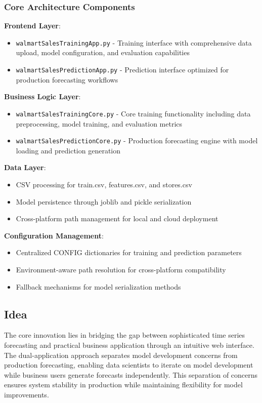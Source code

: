 \subsubsection{Core Architecture Components}

\textbf{Frontend Layer}: 
\begin{itemize}
	\item \texttt{walmartSalesTrainingApp.py} - Training interface with comprehensive data upload, model configuration, and evaluation capabilities
	\item \texttt{walmartSalesPredictionApp.py} - Prediction interface optimized for production forecasting workflows
\end{itemize}

\textbf{Business Logic Layer}:
\begin{itemize}
	\item \texttt{walmartSalesTrainingCore.py} - Core training functionality including data preprocessing, model training, and evaluation metrics
	\item \texttt{walmartSalesPredictionCore.py} - Production forecasting engine with model loading and prediction generation
\end{itemize}

\textbf{Data Layer}:
\begin{itemize}
	\item CSV processing for train.csv, features.csv, and stores.csv
	\item Model persistence through joblib and pickle serialization
	\item Cross-platform path management for local and cloud deployment
\end{itemize}

\textbf{Configuration Management}:
\begin{itemize}
	\item Centralized CONFIG dictionaries for training and prediction parameters
	\item Environment-aware path resolution for cross-platform compatibility
	\item Fallback mechanisms for model serialization methods
\end{itemize}

\subsection{Idea}

The core innovation lies in bridging the gap between sophisticated time series forecasting and practical business application through an intuitive web interface. The dual-application approach separates model development concerns from production forecasting, enabling data scientists to iterate on model development while business users generate forecasts independently. This separation of concerns ensures system stability in production while maintaining flexibility for model improvements.

